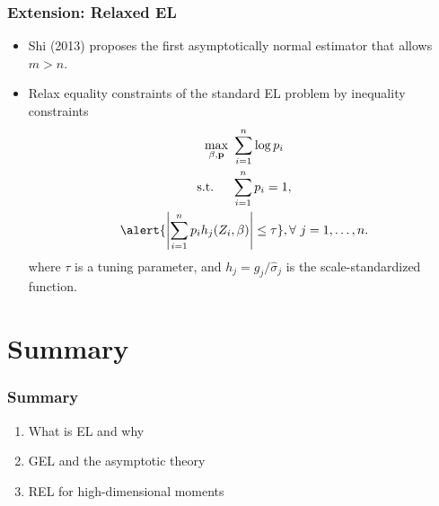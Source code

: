 \documentclass{beamer}
\begin{document}
\begin{frame}
\frametitle{Extension: Relaxed EL}
\begin{itemize}
\item Shi (2013) proposes the first asymptotically normal estimator that allows \(m>n\).\pause
\item Relax equality constraints of the standard EL problem by inequality constraints
\begin{gather*}
\max_{\beta, \mathbf{p}} \ \sum_{i=1}^n \log p_i \\ 
 \mbox{s.t. }\ \ \  \sum_{i=1}^n p_i = 1, \\ 
 \alert{\left|  \sum_{i=1}^n p_i h_{j}(Z_i,\beta)\right| \leq \tau}, \forall\   j=1,\ldots,n.
\end{gather*}where \(\tau\) is a tuning parameter, and \(h_{j} =g_j/ \widehat{\sigma}_j\)
is the scale-standardized function. 
\end{itemize}
\end{frame}



\section{Summary}
\begin{frame}
\frametitle{Summary}

\begin{enumerate}
\item What is EL and why
\item GEL and the asymptotic theory 
\item REL for high-dimensional moments
\end{enumerate}

\end{frame}
\end{document}
